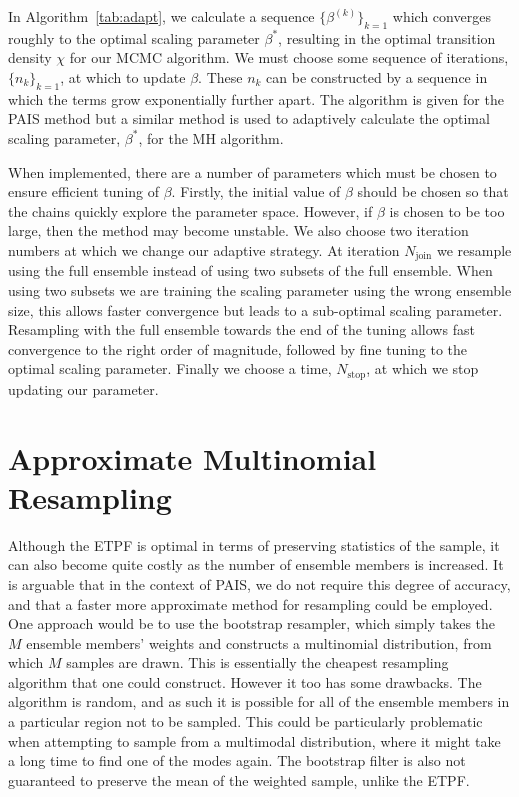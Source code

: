 \documentclass[final]{siamltex}
\begin{document}
 In Algorithm~\ref{tab:adapt}, we calculate a sequence $\{\beta^{(k)}\}_{k=1}$ which converges roughly to the optimal scaling parameter $\beta^*$, resulting in the optimal transition density $\chi$ for our MCMC algorithm. We must choose some sequence of iterations, $\{n_k\}_{k=1}$, at which to update $\beta$. These $n_k$ can be constructed by a sequence in which the terms grow exponentially further apart. The algorithm is given for the PAIS method but a similar method is used to adaptively calculate the optimal scaling parameter, $\beta^*$, for the MH algorithm.

When implemented, there are a number of parameters which must be
chosen to ensure efficient tuning of $\beta$. Firstly, the initial
value of $\beta$ should be chosen so that the chains quickly explore the parameter space. However, if $\beta$ is chosen to be too
large, then the method may become unstable. We also choose two
iteration numbers at which we change our adaptive strategy. At
iteration $N_\text{join}$ we resample using the full ensemble instead
of using two subsets of the full ensemble. When using two subsets we
are training the scaling parameter using the wrong ensemble size, this
allows faster convergence but leads to a sub-optimal scaling
parameter. Resampling with the full ensemble towards the end of the
tuning allows fast convergence to the right order of magnitude,
followed by fine tuning to the optimal scaling parameter. Finally we
choose a time, $N_\text{stop}$, at which we stop updating our
parameter.

\section{Approximate Multinomial Resampling}\label{sec:AMR}
Although the ETPF is optimal in terms of preserving statistics of the
sample, it can also become quite costly as the number of ensemble members
is increased. It is arguable that in the context of PAIS, we do not
require this degree of accuracy, and that a faster more approximate
method for resampling could be employed. One approach would be to use
the bootstrap resampler, which simply takes the $M$ ensemble members'
weights and constructs a multinomial distribution, from which $M$
samples are drawn. This is essentially the cheapest resampling
algorithm that one could construct. However it too has some
drawbacks. The algorithm is random, and as such it is possible for all
of the ensemble members in a particular region not to be sampled. This
could be particularly problematic when attempting to sample from a
multimodal distribution, where it might take a long time to find one
of the modes again. The bootstrap filter is also not guaranteed to
preserve the mean of the weighted sample, unlike the ETPF.
\end{document}
